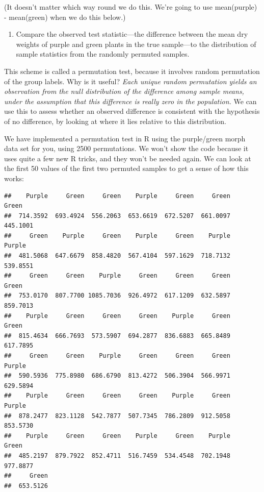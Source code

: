\documentclass[]{book}
\providecommand{\tightlist}{%
  \setlength{\itemsep}{0pt}\setlength{\parskip}{0pt}}
\begin{document}
(It doesn't matter which way round we do this. We're going to use
mean(purple) - mean(green) when we do this below.)

\begin{enumerate}
\def\labelenumi{\arabic{enumi}.}
\setcounter{enumi}{3}
\tightlist
\item
  Compare the observed test statistic---the difference between the mean
  dry weights of purple and green plants in the true sample---to the
  distribution of sample statistics from the randomly permuted samples.
\end{enumerate}

This scheme is called a permutation test, because it involves random
permutation of the group labels. Why is it useful? \emph{Each unique
random permutation yields an observation from the null distribution of
the difference among sample means, under the assumption that this
difference is really zero in the population.} We can use this to assess
whether an observed difference is consistent with the hypothesis of no
difference, by looking at where it lies relative to this distribution.

We have implemented a permutation test in R using the purple/green morph
data set for you, using 2500 permutations. We won't show the code
because it uses quite a few new R tricks, and they won't be needed
again. We can look at the first 50 values of the first two permuted
samples to get a sense of how this works:

\begin{verbatim}
##    Purple     Green     Green    Purple     Green     Green     Green 
##  714.3592  693.4924  556.2063  653.6619  672.5207  661.0097  445.1001 
##     Green    Purple     Green    Purple     Green    Purple    Purple 
##  481.5068  647.6679  858.4820  567.4104  597.1629  718.7132  539.8551 
##     Green     Green    Purple     Green     Green     Green     Green 
##  753.0170  807.7700 1085.7036  926.4972  617.1209  632.5897  859.7013 
##    Purple     Green     Green     Green    Purple     Green     Green 
##  815.4634  666.7693  573.5907  694.2877  836.6883  665.8489  617.7895 
##     Green     Green    Purple     Green     Green     Green    Purple 
##  590.5936  775.8980  686.6790  813.4272  506.3904  566.9971  629.5894 
##    Purple     Green     Green     Green    Purple     Green    Purple 
##  878.2477  823.1128  542.7877  507.7345  786.2809  912.5058  853.5730 
##    Purple     Green     Green    Purple     Green    Purple     Green 
##  485.2197  879.7922  852.4711  516.7459  534.4548  702.1948  977.8877 
##     Green 
##  653.5126
\end{verbatim}
\end{document}
